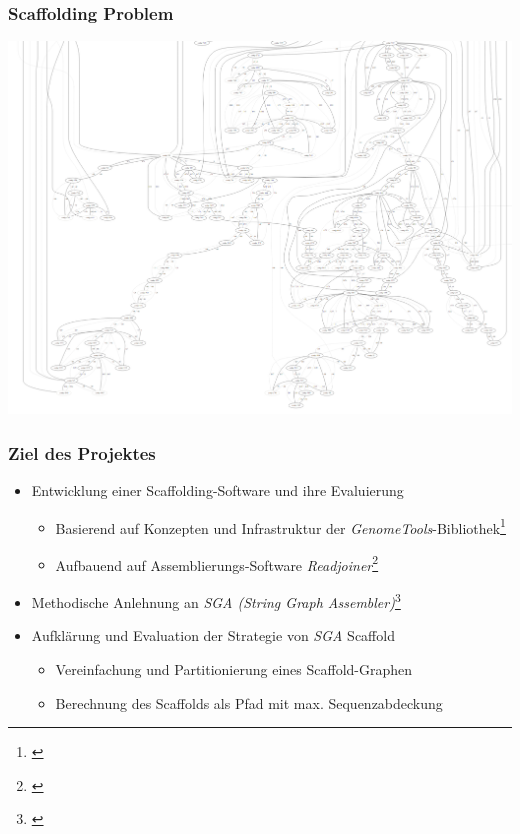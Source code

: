 \documentclass[xcolor=pst]{beamer}
\begin{document}
\begin{frame}
  \frametitle{Scaffolding Problem}
  \begin{center}
    \includegraphics[width=\textwidth,height=\textheight,keepaspectratio]{figures/Scaffolding_graph.png}
  \end{center}
\end{frame}

\begin{frame}
  \frametitle{Ziel des Projektes}
  \begin{itemize}
  \item Entwicklung einer Scaffolding-Software und ihre Evaluierung
  \begin{itemize}
    \item Basierend auf Konzepten und Infrastruktur der \textit{GenomeTools}-Bibliothek\footnote{\cite{Gremme:2013}}
    \item Aufbauend auf Assemblierungs-Software \textit{Readjoiner}\footnote{\cite{Gonnella:2012gn}}
  \end{itemize}
  \item Methodische Anlehnung an \textit{SGA (String Graph Assembler)}\footnote{\cite{Simpson:2012ef}}
  \item Aufklärung und Evaluation der Strategie von \textit{SGA} Scaffold
  \begin{itemize}
    \item Vereinfachung und Partitionierung eines Scaffold-Graphen
    \item Berechnung des Scaffolds als Pfad mit max. Sequenzabdeckung
  \end{itemize}
  \end{itemize}
\end{frame}
\end{document}
